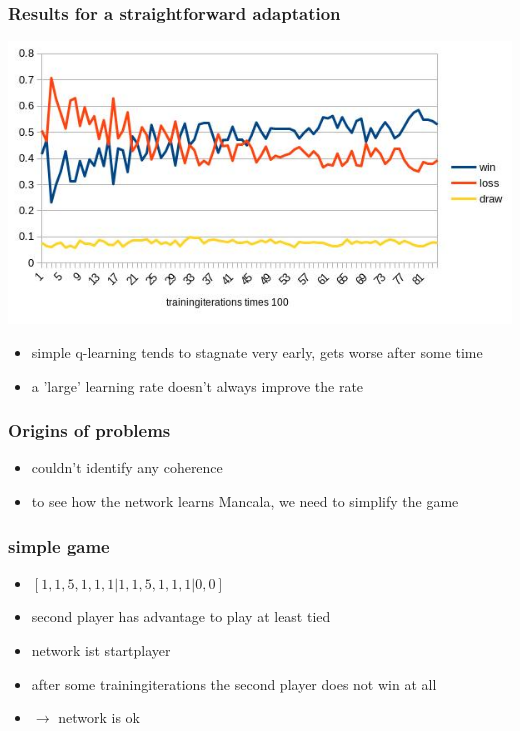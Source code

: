 \documentclass{beamer}
\begin{document}
 \begin{frame}
\frametitle{Results for a straightforward adaptation}
\includegraphics[scale=0.65]{gewinnrate.jpg}
\begin{itemize}
\item simple q-learning tends to stagnate very early, gets worse after some time
\item a 'large' learning rate doesn't always improve the rate
\end{itemize}
\end{frame}
 
\begin{frame}
\frametitle{Origins of problems}
\begin{itemize}
\item couldn't identify any coherence
\item to see how the network learns Mancala, we need to simplify the game
\end{itemize}
\end{frame} 
 
 \begin{frame}
 \frametitle{simple game}
\begin{itemize}
\item $[1,1,5,1,1,1|1,1,5,1,1,1|0,0]$
\item second player has advantage to play at least tied
\item network ist startplayer
\item after some trainingiterations the second player does not win at all
\item $\rightarrow$ network is ok
\end{itemize}
 \end{frame}
\end{document}

